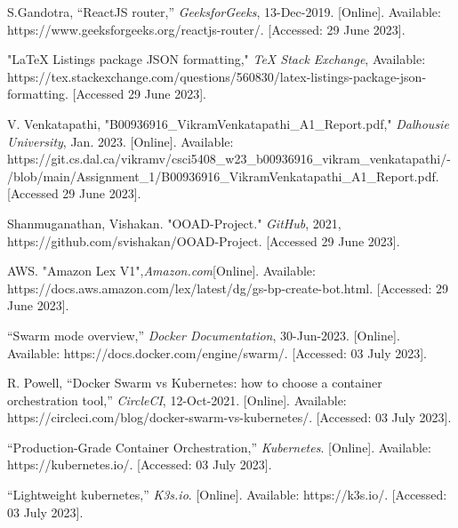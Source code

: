 \begin{sloppypar}
\begin{enumerate}[label={[\arabic*]}]
    \item	S.Gandotra, “ReactJS router,” \textit{GeeksforGeeks}, 13-Dec-2019. [Online]. Available: https://www.geeksforgeeks.org/reactjs-router/. [Accessed: 29 June 2023].
    
    \item "LaTeX Listings package JSON formatting," \textit{TeX Stack Exchange}, Available: https://tex.stackexchange.com/questions/560830/latex-listings-package-json-formatting. [Accessed 29 June 2023].
    
    \item V. Venkatapathi, "B00936916_VikramVenkatapathi_A1_Report.pdf," \textit{Dalhousie University}, Jan. 2023. [Online]. Available: https://git.cs.dal.ca/vikramv/csci5408_w23_b00936916_vikram_venkatapathi/-/blob/main/Assignment_1/B00936916_VikramVenkatapathi_A1_Report.pdf. [Accessed 29 June 2023].
    
    \item Shanmuganathan, Vishakan. "OOAD-Project." \textit{GitHub}, 2021, https://github.com/svishakan/OOAD-Project. [Accessed 29 June 2023].

    \item AWS. "Amazon Lex V1",\textit{Amazon.com}[Online]. Available: https://docs.aws.amazon.com/lex/latest/dg/gs-bp-create-bot.html. [Accessed: 29 June 2023].

    \item “Swarm mode overview,” \textit{Docker Documentation}, 30-Jun-2023. [Online]. Available: https://docs.docker.com/engine/swarm/. [Accessed: 03 July 2023].

    \item R. Powell, “Docker Swarm vs Kubernetes: how to choose a container orchestration tool,” \textit{CircleCI}, 12-Oct-2021. [Online]. Available: https://circleci.com/blog/docker-swarm-vs-kubernetes/. [Accessed: 03 July 2023].

    \item “Production-Grade Container Orchestration,” \textit{Kubernetes}. [Online]. Available: https://kubernetes.io/. [Accessed: 03 July 2023].

    \item “Lightweight kubernetes,” \textit{K3s.io}. [Online]. Available: https://k3s.io/. [Accessed: 03 July 2023].

  \end{enumerate}

\end{sloppypar}
\newpage

